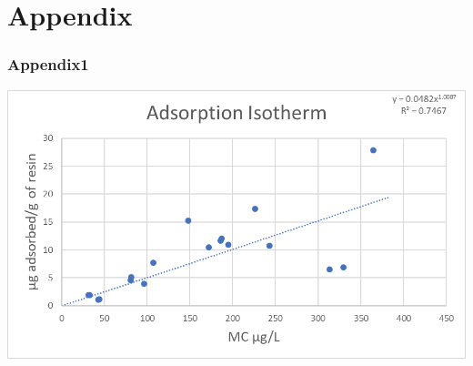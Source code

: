 \section{Appendix}
\begin{frame}
	\frametitle{Appendix1}
	\includegraphics[width=\textwidth]{Isotherm.png}
	

\end{frame}
